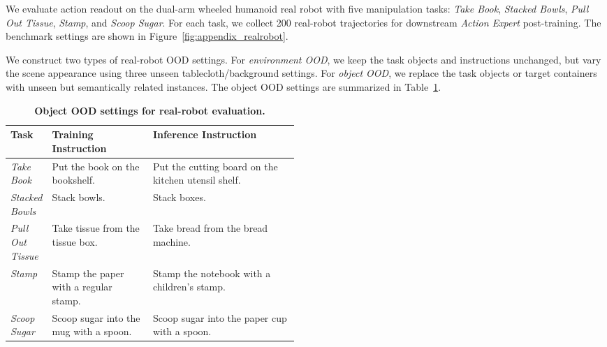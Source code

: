 We evaluate action readout on the dual-arm wheeled humanoid real robot with five manipulation tasks: \textit{Take Book}, \textit{Stacked Bowls}, \textit{Pull Out Tissue}, \textit{Stamp}, and \textit{Scoop Sugar}. 
For each task, we collect 200 real-robot trajectories for downstream \textit{Action Expert} post-training. 
The benchmark settings are shown in Figure~\ref{fig:appendix_realrobot}.

We construct two types of real-robot OOD settings. 
For \textit{environment OOD}, we keep the task objects and instructions unchanged, but vary the scene appearance using three unseen tablecloth/background settings. 
For \textit{object OOD}, we replace the task objects or target containers with unseen but semantically related instances. 
The object OOD settings are summarized in Table~\ref{tab:appendix_object_ood_settings}.


\begin{table}[!htbp]
  \centering
  \caption{\textbf{Object OOD settings for real-robot evaluation.}}
  \label{tab:appendix_object_ood_settings}
  \small
  \setlength{\tabcolsep}{4pt}
  \renewcommand{\arraystretch}{1.08}
  \begin{tabularx}{\linewidth}{
    @{}
    >{\raggedright\arraybackslash}p{0.13\linewidth}
    >{\raggedright\arraybackslash}p{0.35\linewidth}
    >{\raggedright\arraybackslash}X
    @{}
  }
    \toprule[1pt]
    \textbf{Task} & \textbf{Training Instruction} & \textbf{Inference Instruction} \\
    \midrule[0.5pt]
    \textit{Take Book} 
    & Put the book on the bookshelf. 
    & Put the cutting board on the kitchen utensil shelf. \\

    \textit{Stacked Bowls} 
    & Stack bowls. 
    & Stack boxes. \\

    \textit{Pull Out Tissue} 
    & Take tissue from the tissue box. 
    & Take bread from the bread machine. \\

    \textit{Stamp} 
    & Stamp the paper with a regular stamp. 
    & Stamp the notebook with a children's stamp. \\

    \textit{Scoop Sugar} 
    & Scoop sugar into the mug with a spoon. 
    & Scoop sugar into the paper cup with a spoon. \\
    \bottomrule[1pt]
  \end{tabularx}
\end{table}


